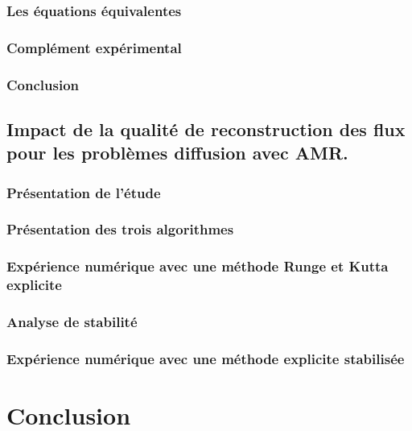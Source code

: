 \documentclass[11pt]{report}
\theoremstyle{definition}
\theoremstyle{remark}
\begin{document}
        \subsection{Les équations équivalentes}  
        \newpage
        \subsection{Complément expérimental}            
        \subsection{Conclusion}                         
    
    \newpage
    \section{Impact de la qualité de reconstruction des flux pour les problèmes diffusion avec AMR.}
        \subsection{Présentation de l'étude}    
        \subsection{Présentation des trois algorithmes}
        \subsection{Expérience numérique avec une méthode Runge et Kutta explicite}
        \subsection{Analyse de stabilité}
        \subsection{Expérience numérique avec une méthode explicite stabilisée}
\chapter{Conclusion}
\end{document}
